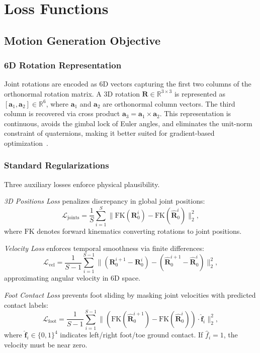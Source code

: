 \section{Loss Functions}
\label{sec:losses}

\subsection{Motion Generation Objective}
\label{sec:vimo_losses}

\subsubsection{6D Rotation Representation}
Joint rotations are encoded as 6D vectors capturing the first two columns of the orthonormal rotation matrix. A 3D rotation $\mathbf{R} \in \mathbb{R}^{3 \times 3}$ is represented as $[\mathbf{a}_1, \mathbf{a}_2] \in \mathbb{R}^6$, where $\mathbf{a}_1$ and $\mathbf{a}_2$ are orthonormal column vectors. The third column is recovered via cross product $\mathbf{a}_3 = \mathbf{a}_1 \times \mathbf{a}_2$. This representation is continuous, avoids the gimbal lock of Euler angles, and eliminates the unit-norm constraint of quaternions, making it better suited for gradient-based optimization~\cite{6drot2020}.

\subsubsection{Standard Regularizations}
Three auxiliary losses enforce physical plausibility.

\textit{3D Positions Loss} penalizes discrepancy in global joint positions:
\[
\mathcal{L}_{\text{joints}} = \frac{1}{S}\sum_{i=1}^{S} \| \text{FK}(\mathbf{R}_0^i) - \text{FK}(\hat{\mathbf{R}}_0^i) \|_2^2,
\]
where $\text{FK}$ denotes forward kinematics converting rotations to joint positions.

\textit{Velocity Loss} enforces temporal smoothness via finite differences:
\[
\mathcal{L}_{\text{vel}} = \frac{1}{S-1}\sum_{i=1}^{S-1} \| (\mathbf{R}_0^{i+1} - \mathbf{R}_0^i) - (\hat{\mathbf{R}}_0^{i+1} - \hat{\mathbf{R}}_0^i) \|_2^2,
\]
approximating angular velocity in 6D space.

\textit{Foot Contact Loss} prevents foot sliding by masking joint velocities with predicted contact labels:
\[
\mathcal{L}_{\text{foot}} = \frac{1}{S-1}\sum_{i=1}^{S-1} \| (\text{FK}(\hat{\mathbf{R}}_0^{i+1}) - \text{FK}(\hat{\mathbf{R}}_0^i)) \cdot \hat{\mathbf{f}}_i \|_2^2,
\]
where $\hat{\mathbf{f}}_i \in \{0,1\}^4$ indicates left/right foot/toe ground contact. If $\hat{f}_i = 1$, the velocity must be near zero.

